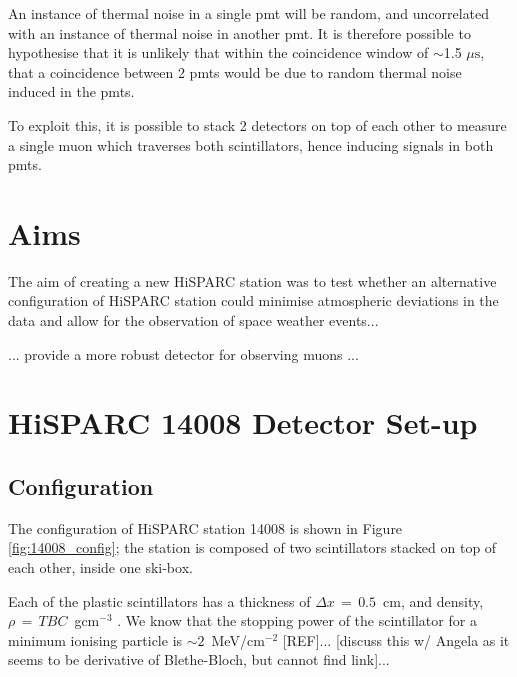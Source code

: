 An instance of thermal noise in a single \gls{pmt} will be random, and uncorrelated with an instance of thermal noise in another \gls{pmt}. It is therefore possible to hypothesise that it is unlikely that within the coincidence window of $\sim$1.5 $\mu \mathrm{s}$, that a coincidence between 2 \glspl{pmt} would be due to random thermal noise induced in the \glspl{pmt}.

To exploit this, it is possible to stack 2 detectors on top of each other to measure a single muon which traverses both scintillators, hence inducing signals in both \glspl{pmt}.



\section{Aims}\label{sec:HS_14008_aims}

The aim of creating a new HiSPARC station was to test whether an alternative configuration of HiSPARC station could minimise atmospheric deviations in the data and allow for the observation of space weather events...

... provide a more robust detector for observing muons ...



\section{HiSPARC 14008 Detector Set-up}\label{sec:HiSPARC_14008}


\subsection{Configuration}

The configuration of HiSPARC station 14008 is shown in Figure \ref{fig:14008_config}; the station is composed of two scintillators stacked on top of each other, inside one ski-box. 

Each of the plastic scintillators has a thickness of $\Delta x \, = \, 0.5$~cm, and density, $\rho \, = \, TBC$~gcm$^{-3}$ . We know that the stopping power of the scintillator for a minimum ionising particle is $\sim 2$~MeV/cm$^{-2}$ [REF]... [discuss this w/ Angela as it seems to be derivative of Blethe-Bloch, but cannot find link]...

